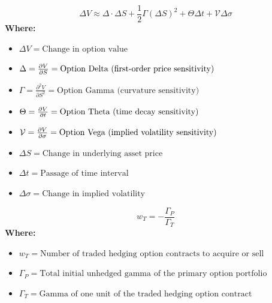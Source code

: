 \begin{formulabox}
\begin{equation}
\Delta V \approx \Delta \cdot \Delta S + \frac{1}{2} \Gamma (\Delta S)^2 + \Theta \Delta t + \mathcal{V} \Delta \sigma
\end{equation}
\textbf{Where:}
\begin{itemize}[noitemsep, topsep=2pt]
    \item $\Delta V = \text{Change in option value}$
    \item $\Delta = \frac{\partial V}{\partial S} = \text{Option Delta (first-order price sensitivity)}$
    \item $\Gamma = \frac{\partial^2 V}{\partial S^2} = \text{Option Gamma (curvature sensitivity)}$
    \item $\Theta = \frac{\partial V}{\partial t} = \text{Option Theta (time decay sensitivity)}$
    \item $\mathcal{V} = \frac{\partial V}{\partial \sigma} = \text{Option Vega (implied volatility sensitivity)}$
    \item $\Delta S = \text{Change in underlying asset price}$
    \item $\Delta t = \text{Passage of time interval}$
    \item $\Delta \sigma = \text{Change in implied volatility}$
\end{itemize}
\end{formulabox}

\begin{formulabox}
\begin{equation}
w_T = -\frac{\Gamma_P}{\Gamma_T}
\end{equation}
\textbf{Where:}
\begin{itemize}[noitemsep, topsep=2pt]
    \item $w_T = \text{Number of traded hedging option contracts to acquire or sell}$
    \item $\Gamma_P = \text{Total initial unhedged gamma of the primary option portfolio}$
    \item $\Gamma_T = \text{Gamma of one unit of the traded hedging option contract}$
\end{itemize}
\end{formulabox}
